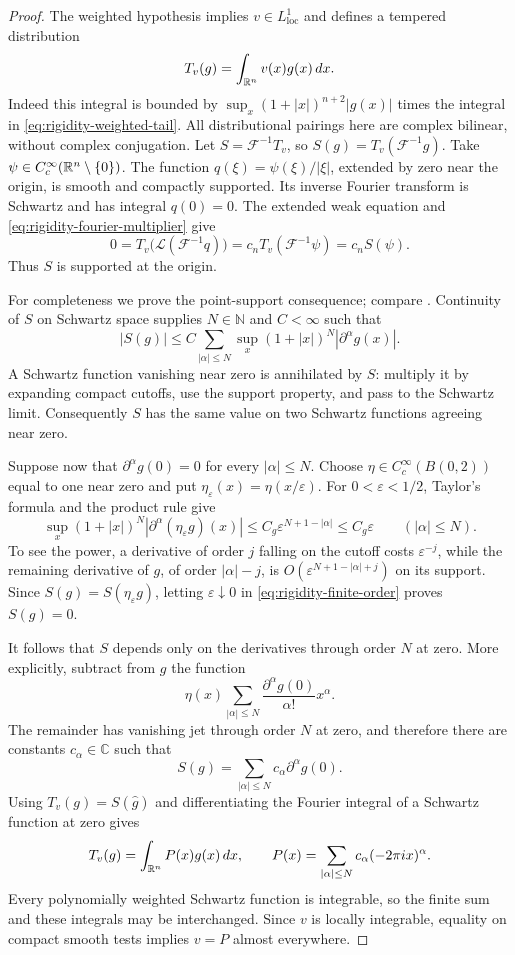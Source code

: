 \begin{proof}
The weighted hypothesis implies $v\in L^1_{\mathrm{loc}}$ and defines a
tempered distribution
\[
 T_v(g)=\int_{\mathbb R^n}v(x)g(x)\,dx.
\]
Indeed this integral is bounded by
$\sup_x(1+|x|)^{n+2}|g(x)|$ times the integral in
\eqref{eq:rigidity-weighted-tail}.  All distributional pairings here are
complex bilinear, without complex conjugation.
Let $S=\mathcal F^{-1}T_v$, so
$S(g)=T_v(\mathcal F^{-1}g)$.
Take $\psi\in C_c^\infty(\mathbb R^n\setminus\{0\})$.
The function $q(\xi)=\psi(\xi)/|\xi|$, extended by zero near the
origin, is smooth and compactly supported.  Its inverse Fourier transform
is Schwartz and has integral $q(0)=0$.  The extended weak equation and
\eqref{eq:rigidity-fourier-multiplier} give
\[
 0=T_v\bigl(\mathcal L(\mathcal F^{-1}q)\bigr)
   =c_nT_v(\mathcal F^{-1}\psi)=c_n S(\psi).
\]
Thus $S$ is supported at the origin.

For completeness we prove the point-support consequence; compare
\cite[Theorem~2.3.4]{Hormander2003}. Continuity of
$S$ on Schwartz space supplies $N\in\mathbb N$ and $C<\infty$ such that
\begin{equation}\label{eq:rigidity-finite-order}
 |S(g)|\le C\sum_{|\alpha|\le N}
       \sup_x(1+|x|)^N|\partial^\alpha g(x)|.
\end{equation}
A Schwartz function vanishing near zero is annihilated by $S$: multiply it
by expanding compact cutoffs, use the support property, and pass to the
Schwartz limit.  Consequently $S$ has the same value on two Schwartz
functions agreeing near zero.

Suppose now that $\partial^\alpha g(0)=0$ for every $|\alpha|\le N$.
Choose $\eta\in C_c^\infty(B(0,2))$ equal to one near zero and put
$\eta_\varepsilon(x)=\eta(x/\varepsilon)$.
For $0<\varepsilon<1/2$, Taylor's formula and the product rule give
\[
 \sup_x(1+|x|)^N
       |\partial^\alpha(\eta_\varepsilon g)(x)|
       \le C_g\varepsilon^{N+1-|\alpha|}
       \le C_g\varepsilon
       \qquad (|\alpha|\le N).
\]
To see the power, a derivative of order $j$ falling on the cutoff costs
$\varepsilon^{-j}$, while the remaining derivative of $g$, of order
$|\alpha|-j$, is $O(\varepsilon^{N+1-|\alpha|+j})$ on its support.
Since $S(g)=S(\eta_\varepsilon g)$, letting $\varepsilon\downarrow0$
in \eqref{eq:rigidity-finite-order} proves $S(g)=0$.

It follows that $S$ depends only on the derivatives through order $N$ at
zero.  More explicitly, subtract from $g$ the function
\[
 \eta(x)\sum_{|\alpha|\le N}
           \frac{\partial^\alpha g(0)}{\alpha!}x^\alpha.
\]
The remainder has vanishing jet through order $N$ at zero, and therefore there are
constants $c_\alpha\in\mathbb C$ such that
\[
 S(g)=\sum_{|\alpha|\le N}c_\alpha\partial^\alpha g(0).
\]
Using $T_v(g)=S(\widehat g)$ and differentiating the Fourier integral
of a Schwartz function at zero gives
\[
 T_v(g)=\int_{\mathbb R^n}P(x)g(x)\,dx,
 \qquad
 P(x)=\sum_{|\alpha|\le N}c_\alpha(-2\pi i x)^\alpha.
\]
Every polynomially weighted Schwartz function is integrable, so the
finite sum and these integrals may be interchanged.
Since $v$ is locally integrable, equality on compact smooth tests implies
$v=P$ almost everywhere.


\end{proof}
